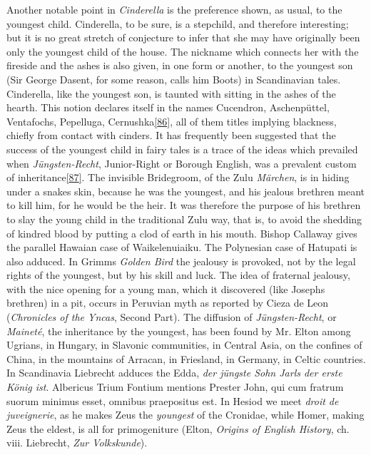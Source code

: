 \documentclass[14pt,a4paper]{memoir}
\begin{document}
Another notable point in \emph{Cinderella} is the preference shown, as
usual, to the youngest child. Cinderella, to be sure, is a stepchild,
and therefore interesting; but it is no great stretch of conjecture to
infer that she may have originally been only the youngest child of the
house. The nickname which connects her with the fireside and the ashes
is also given, in one form or another, to the youngest son (Sir George
Dasent, for some reason, calls him
\textquotesingle Boots\textquotesingle) in Scandinavian tales.
Cinderella, like the youngest son, is taunted with sitting in the ashes
of the hearth. This notion declares itself in the names Cucendron,
Aschenpüttel, Ventafochs, Pepelluga,
Cernushka\protect\hypertarget{4533318093929944247_33931-h-1.htm.xhtmlux5cux23FNanchor_86}{}{}\protect\hyperlink{4533318093929944247_33931-h-1.htm.xhtmlux5cux23Footnote_86}{{[}86{]}},
all of them titles implying blackness, chiefly from contact with
cinders. It has frequently been suggested that the success of the
youngest child in fairy tales is a trace of the ideas which prevailed
when \emph{Jüngsten-Recht},
\textquotesingle Junior-Right\textquotesingle{} or Borough English, was
a prevalent custom of
inheritance\protect\hypertarget{4533318093929944247_33931-h-1.htm.xhtmlux5cux23FNanchor_87}{}{}\protect\hyperlink{4533318093929944247_33931-h-1.htm.xhtmlux5cux23Footnote_87}{{[}87{]}}.
The invisible Bridegroom, of the Zulu \emph{Märchen}, is in hiding under
a snake\textquotesingle s skin, because he was the youngest, and his
jealous brethren meant to kill him, for he would be the heir. It was
therefore the purpose of his brethren to slay the young child in the
traditional Zulu way, that is, to avoid the shedding of
\textquotesingle kindred blood\textquotesingle{} by putting a clod of
earth in his mouth. Bishop Callaway gives the parallel Hawaian case of
Waikelenuiaiku. The Polynesian case of Hatupati is also adduced. In
Grimm\textquotesingle s \emph{Golden Bird} the jealousy is provoked, not
by the legal rights of the youngest, but by his skill and luck. The idea
of fraternal jealousy, with the \textquotesingle nice opening for a
young man,\textquotesingle{} which it discovered (like
Joseph\textquotesingle s brethren) in a pit, occurs in Peruvian myth as
reported by Cieza de Leon (\emph{Chronicles of the Yncas}, Second Part).
The diffusion of \emph{Jüngsten-Recht}, or \emph{Maineté}, the
inheritance by the youngest, has been found by Mr. Elton among Ugrians,
in Hungary, in Slavonic communities, in Central Asia, on the confines of
China, in the mountains of Arracan, in Friesland, in Germany, in Celtic
countries. In Scandinavia Liebrecht adduces the Edda,
\textquotesingle{}\emph{der jüngste Sohn Jarl\textquotesingle s der
erste König ist}.\textquotesingle{} Albericus Trium Fontium mentions
Prester John, \textquotesingle qui cum fratrum suorum minimus esset,
omnibus praepositus est.\textquotesingle{} In Hesiod we meet \emph{droit
de juveignerie}, as he makes Zeus the \emph{youngest} of the Cronidae,
while Homer, making Zeus the eldest, is all for primogeniture (Elton,
\emph{Origins of English History}, ch. viii. Liebrecht, \emph{Zur
Volkskunde}).
\end{document}
